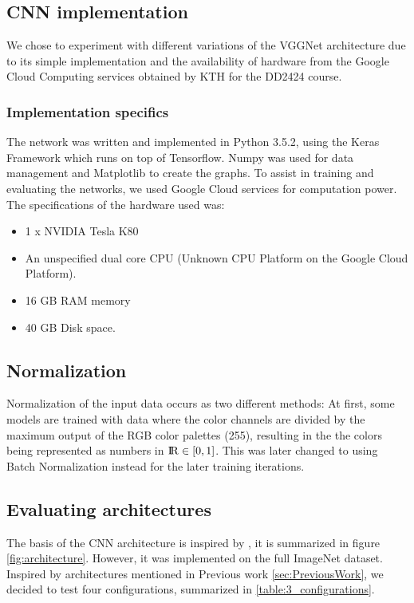\documentclass{kthreport}
\begin{document}
\subsection{CNN implementation}

We chose to experiment with different variations of the VGGNet architecture due to its simple implementation and the availability of hardware from the Google Cloud Computing services obtained by KTH for the DD2424 course.

\subsubsection{Implementation specifics}

The network was written and implemented in Python 3.5.2, using the Keras Framework which runs on top of Tensorflow. Numpy was used for data management and Matplotlib to create the graphs. To assist in training and evaluating the networks, we used Google Cloud services for computation power. The specifications of the hardware used was:

\begin{itemize}
  \item 1 x NVIDIA Tesla K80
  \item An unspecified dual core CPU (Unknown CPU Platform on the Google Cloud Platform).
  \item 16 GB RAM memory
  \item 40 GB Disk space.
\end{itemize}

\subsection{Normalization}
Normalization of the input data occurs as two different methods: At first, some models are trained with data where the color channels are divided by the maximum output of the RGB color palettes (255), resulting in the the colors being represented as numbers in ${\rm I\!R} \in [0,1]$.
This was later changed to using Batch Normalization instead for the later training iterations.

\subsection{Evaluating architectures}

The basis of the CNN architecture is inspired by \cite{NIPS2012_4824}, it is summarized in figure \ref{fig:architecture}. However, it was implemented on the full ImageNet dataset. Inspired by architectures mentioned in Previous work \ref{sec:PreviousWork}, we decided to test four configurations, summarized in \ref{table:3_configurations}.
\end{document}
